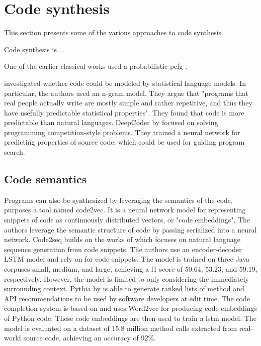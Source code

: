 \section{Code synthesis}
This section presents some of the various approaches to code synthesis. 

Code synthesis is ... 

One of the earlier classical works used a probabilistic \acrfull{pcfg} \cite{allamanis2015bimodal}.

\textcite{hindle2012natural} investigated whether code could be modeled by statistical language models. In particular, the authors used an n-gram model. They argue that "programs that real people actually write are mostly simple and rather repetitive, and thus they have usefully predictable statistical properties". They found that code is more predictable than natural languages. DeepCoder by \textcite{balog2017deepcoder} focused on solving programming competition-style problems. They trained a neural network for predicting properties of source code, which could be used for guiding program search.

\subsection{Code semantics}
Programs can also be synthesized by leveraging the semantics of the code. \textcite{alon2018code2vec} purposes a tool named code2vec. It is a neural network model for representing snippets of code as continuously distributed vectors, or "code embeddings". The authors leverage the semantic structure of code by passing serialized  into a neural network. Code2seq \cite{alon2018code2seq} builds on the works of \textcite{alon2018code2vec} which focuses on natural language sequence generation from code snippets. The authors use an encoder-decoder LSTM model and rely on  for code snippets. The model is trained on three Java corpuses small, medium, and large, achieving a \gls{f1} score of 50.64, 53.23, and 59.19, respectively. However, the model is limited to only considering the immediately surrounding context. Pythia by \textcite{svyatkovskiy2019pyhia} is able to generate ranked lists of method and API recommendations to be used by software developers at edit time. The code completion system is based on  and uses Word2vec for producing code embeddings of Python code. These code embeddings are then used to train a \gls{lstm} model. The model is evaluated on a dataset of 15.8 million method calls extracted from real-world source code, achieving an accuracy of 92\%.

